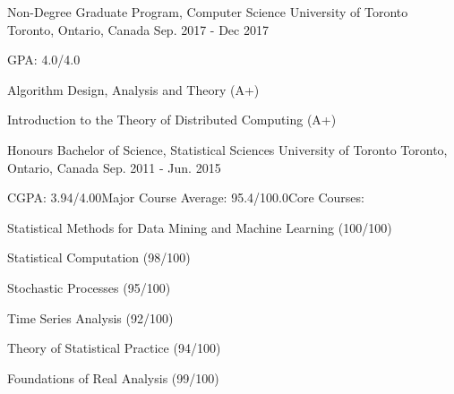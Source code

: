 
\begin{cventries}

  \cventry
    {Non-Degree Graduate Program, Computer Science} %
    {University of Toronto} %
    {Toronto, Ontario, Canada} %
    {Sep. 2017 - Dec 2017} %
    {GPA: 4.0/4.0\newline \hphantom{0}
      \begin{cvitems}
        \item {Algorithm Design, Analysis and Theory (A+)}
        \item {Introduction to the Theory of Distributed Computing (A+)}
      \end{cvitems}
    }
\end{cventries}
\begin{cventries}
  \cventry
    {Honours Bachelor of Science, Statistical Sciences} %
    {University of Toronto} %
    {Toronto, Ontario, Canada} %
    {Sep. 2011 - Jun. 2015} %
    {CGPA: 3.94/4.00\newline Major Course Average: 95.4/100.0\newline Core Courses: \newline \hphantom{0}
      \begin{cvitems}
        \item {Statistical Methods for Data Mining and Machine Learning (100/100)}
        \item {Statistical Computation (98/100)}
        \item {Stochastic Processes (95/100)}
        \item {Time Series Analysis (92/100)}
        \item {Theory of Statistical Practice (94/100)}
        \item {Foundations of Real Analysis (99/100)}
      \end{cvitems}
    }
\end{cventries}
